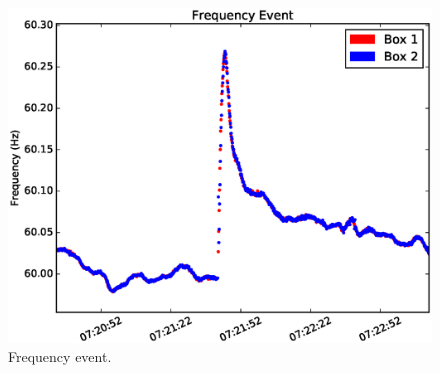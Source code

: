 \documentclass[a4paper, conference]{IEEEtran}
\begin{document}
\begin{figure}[h]
    \centering
    \includegraphics[width=\columnwidth]{img/Event1_f.eps}
    \caption{Frequency event.}
    \label{fig:event}
\end{figure}

%
%

\end{document}
